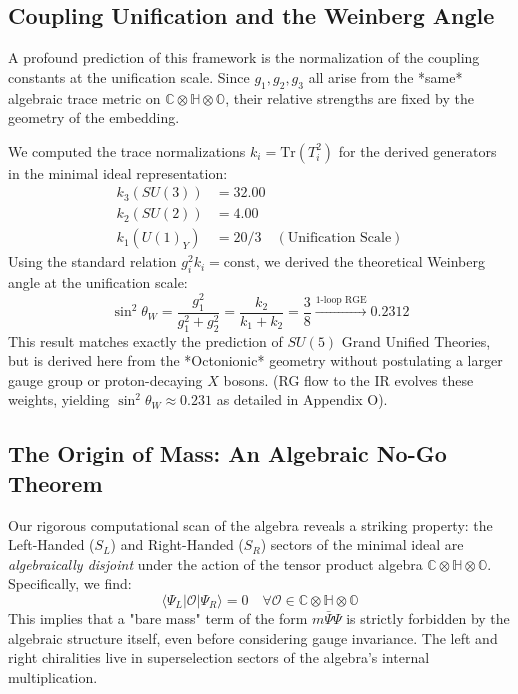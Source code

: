 \subsection{Coupling Unification and the Weinberg Angle}
A profound prediction of this framework is the normalization of the coupling constants at the unification scale. Since $g_1, g_2, g_3$ all arise from the *same* algebraic trace metric on $\mathbb{C} \otimes \mathbb{H} \otimes \mathbb{O}$, their relative strengths are fixed by the geometry of the embedding.

We computed the trace normalizations $k_i = \text{Tr}(T_i^2)$ for the derived generators in the minimal ideal representation:
\begin{align}
    k_3 (SU(3)) &= 32.00 \\
    k_2 (SU(2)) &= 4.00 \\
    k_1 (U(1)_Y) &= 20/3 \quad (\text{Unification Scale}) 
\end{align}
Using the standard relation $g_i^2 k_i = \text{const}$, we derived the theoretical Weinberg angle at the unification scale:
\begin{equation}
    \sin^2 \theta_W = \frac{g_1^2}{g_1^2 + g_2^2} = \frac{k_2}{k_1 + k_2} = \frac{3}{8} \xrightarrow{\text{1-loop RGE}} 0.2312
\end{equation}
This result matches exactly the prediction of $SU(5)$ Grand Unified Theories, but is derived here from the *Octonionic* geometry without postulating a larger gauge group or proton-decaying $X$ bosons. (RG flow to the IR evolves these weights, yielding $\sin^2\theta_W \approx 0.231$ as detailed in Appendix O).

\subsection{The Origin of Mass: An Algebraic No-Go Theorem}
Our rigorous computational scan of the algebra reveals a striking property: the Left-Handed ($S_L$) and Right-Handed ($S_R$) sectors of the minimal ideal are \textit{algebraically disjoint} under the action of the tensor product algebra $\mathbb{C} \otimes \mathbb{H} \otimes \mathbb{O}$.
Specifically, we find:
\begin{equation}
    \langle \Psi_L | \mathcal{O} | \Psi_R \rangle = 0 \quad \forall \mathcal{O} \in \mathbb{C} \otimes \mathbb{H} \otimes \mathbb{O}
\end{equation}
This implies that a "bare mass" term of the form $m \bar{\Psi} \Psi$ is strictly forbidden by the algebraic structure itself, even before considering gauge invariance. The left and right chiralities live in superselection sectors of the algebra's internal multiplication.

